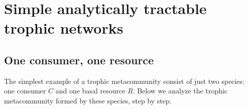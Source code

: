 \documentclass[11pt]{article}
\begin{document}



\section{Simple analytically tractable trophic networks} \label{sec:anal}

\subsection{One consumer, one resource} \label{sec:CR}

The simplest example of a trophic metacommunity consist of just two species: one consumer $C$ and one basal resource $R$. Below we analyze the trophic metacommunity formed by these species, step by step.
\end{document}
